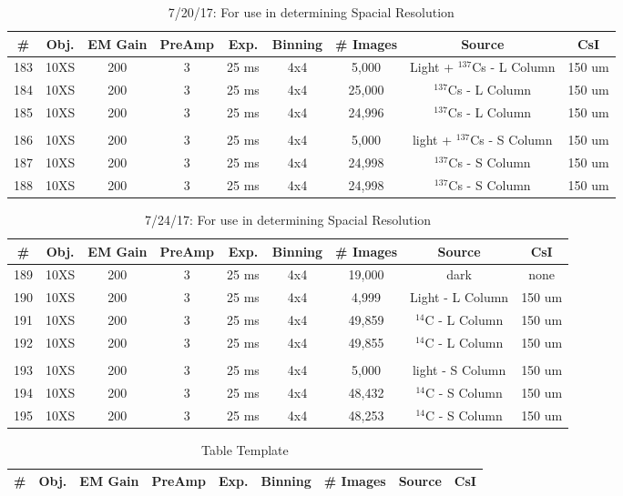 \documentclass[12pt]{amsart}
\begin{document}
\begin{table}[!htbp]
	\centering
	\caption{7/20/17: For use in determining Spacial Resolution}
	\label{tab:table33}
	\hspace*{-1cm}
	\begin{tabular}{ccccccccc}
	\toprule
	\# & Obj. & EM Gain & PreAmp & Exp. & Binning & \# Images & Source & CsI\\
	\midrule
	183 & 10XS & 200 & 3 & 25 ms & 4x4 & 5,000 & Light + $^{137}$Cs - L Column & 150 um\\
	184 & 10XS & 200 & 3 & 25 ms & 4x4 & 25,000 & $^{137}$Cs - L Column & 150 um\\
	185 & 10XS & 200 & 3 & 25 ms & 4x4 & 24,996 & $^{137}$Cs - L Column & 150 um\\
	 & \\
	186 & 10XS & 200 & 3 & 25 ms & 4x4 & 5,000 & light + $^{137}$Cs - S Column & 150 um\\
	187 & 10XS & 200 & 3 & 25 ms & 4x4 & 24,998 & $^{137}$Cs - S Column & 150 um\\
	188 & 10XS & 200 & 3 & 25 ms & 4x4 & 24,998 & $^{137}$Cs - S Column & 150 um\\
	\bottomrule
	\end{tabular}
	\hspace*{-1cm}
\end{table}

\begin{table}[!htbp]
	\centering
	\caption{7/24/17: For use in determining Spacial Resolution}
	\label{tab:table34}
	\hspace*{-1cm}
	\begin{tabular}{ccccccccc}
	\toprule
	\# & Obj. & EM Gain & PreAmp & Exp. & Binning & \# Images & Source & CsI\\
	\midrule
	189 & 10XS & 200 & 3 & 25 ms & 4x4 & 19,000 & dark & none\\
	190 & 10XS & 200 & 3 & 25 ms & 4x4 & 4,999 & Light - L Column & 150 um\\
	191 & 10XS & 200 & 3 & 25 ms & 4x4 & 49,859 & $^{14}$C - L Column & 150 um\\
	192 & 10XS & 200 & 3 & 25 ms & 4x4 & 49,855 & $^{14}$C - L Column & 150 um\\
	 & \\
	193 & 10XS & 200 & 3 & 25 ms & 4x4 & 5,000 & light - S Column & 150 um\\
	194 & 10XS & 200 & 3 & 25 ms & 4x4 & 48,432 & $^{14}$C - S Column & 150 um\\
	195 & 10XS & 200 & 3 & 25 ms & 4x4 & 48,253 & $^{14}$C - S Column & 150 um\\
	\bottomrule
	\end{tabular}
	\hspace*{-1cm}
\end{table}

\begin{table}[!htbp]
	\centering
	\caption{Table Template}
	\label{tab:table0000}
	\hspace*{-1cm}
	\begin{tabular}{ccccccccc}
	\toprule
	\# & Obj. & EM Gain & PreAmp & Exp. & Binning & \# Images & Source & CsI\\
	\midrule
	\bottomrule
	\end{tabular}
	\hspace*{-1cm}
\end{table}
\end{document}
